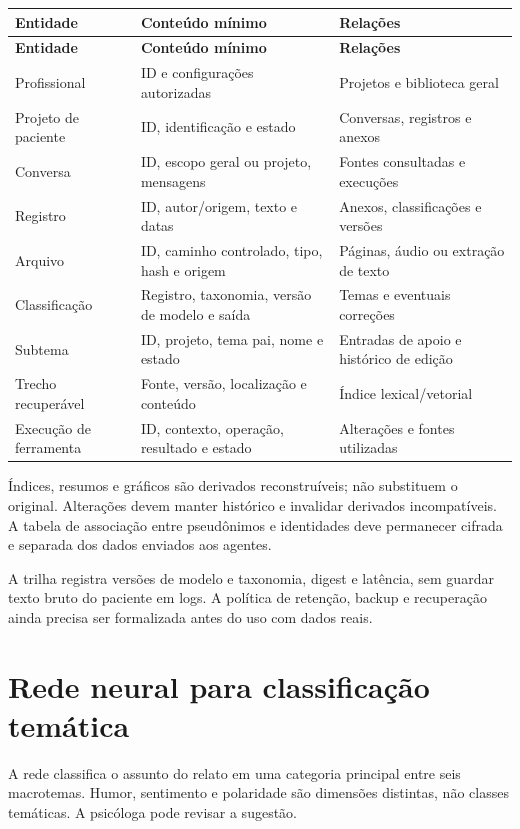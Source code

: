 \documentclass[11pt,a4paper]{article}
\begin{document}
\begingroup\small
\begin{longtable}{>{\raggedright\arraybackslash}p{}>{\raggedright\arraybackslash}p{}>{\raggedright\arraybackslash}p{}}
\toprule
\textbf{Entidade} & \textbf{Conteúdo mínimo} & \textbf{Relações} \\ \midrule\endfirsthead
\toprule
\textbf{Entidade} & \textbf{Conteúdo mínimo} & \textbf{Relações} \\ \midrule\endhead
\bottomrule\endfoot
Profissional & ID e configurações autorizadas & Projetos e biblioteca geral \\[3pt]
Projeto de paciente & ID, identificação e estado & Conversas, registros e anexos \\[3pt]
Conversa & ID, escopo geral ou projeto, mensagens & Fontes consultadas e execuções \\[3pt]
Registro & ID, autor/origem, texto e datas & Anexos, classificações e versões \\[3pt]
Arquivo & ID, caminho controlado, tipo, hash e origem & Páginas, áudio ou extração de texto \\[3pt]
Classificação & Registro, taxonomia, versão de modelo e saída & Temas e eventuais correções \\[3pt]
Subtema & ID, projeto, tema pai, nome e estado & Entradas de apoio e histórico de edição \\[3pt]
Trecho recuperável & Fonte, versão, localização e conteúdo & Índice lexical/vetorial \\[3pt]
Execução de ferramenta & ID, contexto, operação, resultado e estado & Alterações e fontes utilizadas \\[3pt]
\end{longtable}
\endgroup
Índices, resumos e gráficos são derivados reconstruíveis; não substituem o original. Alterações devem manter histórico e invalidar derivados incompatíveis. A tabela de associação entre pseudônimos e identidades deve permanecer cifrada e separada dos dados enviados aos agentes.

A trilha registra versões de modelo e taxonomia, digest e latência, sem guardar texto bruto do paciente em logs. A política de retenção, backup e recuperação ainda precisa ser formalizada antes do uso com dados reais.

\section{Rede neural para classificação temática}
A rede classifica o assunto do relato em uma categoria principal entre seis macrotemas. Humor, sentimento e polaridade são dimensões distintas, não classes temáticas. A psicóloga pode revisar a sugestão.
\end{document}
